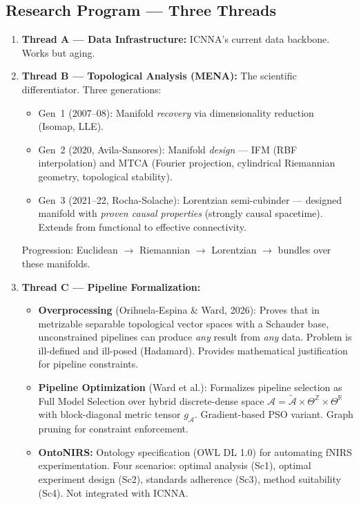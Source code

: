 \documentclass[11pt,a4paper]{article}
\begin{document}
\subsection{Research Program --- Three Threads}
\begin{enumerate}
    \item \textbf{Thread A --- Data Infrastructure:} ICNNA's current data backbone. Works but aging.
    \item \textbf{Thread B --- Topological Analysis (MENA):} The scientific differentiator. Three generations:
    \begin{itemize}
        \item Gen~1 (2007--08): Manifold \emph{recovery} via dimensionality reduction (Isomap, LLE).
        \item Gen~2 (2020, Avila-Sansores): Manifold \emph{design} --- IFM (RBF interpolation) and MTCA (Fourier projection, cylindrical Riemannian geometry, topological stability).
        \item Gen~3 (2021--22, Rocha-Solache): Lorentzian semi-cubinder --- designed manifold with \emph{proven causal properties} (strongly causal spacetime). Extends from functional to effective connectivity.
    \end{itemize}
    Progression: Euclidean $\to$ Riemannian $\to$ Lorentzian $\to$ bundles over these manifolds.
    \item \textbf{Thread C --- Pipeline Formalization:}
    \begin{itemize}
        \item \textbf{Overprocessing} (Orihuela-Espina \& Ward, 2026): Proves that in metrizable separable topological vector spaces with a Schauder base, unconstrained pipelines can produce \emph{any} result from \emph{any} data. Problem is ill-defined and ill-posed (Hadamard). Provides mathematical justification for pipeline constraints.
        \item \textbf{Pipeline Optimization} (Ward et al.): Formalizes pipeline selection as Full Model Selection over hybrid discrete-dense space $\mathcal{A} = \tilde{\mathcal{A}} \times \Theta^{\mathbb{Z}} \times \Theta^{\mathbb{R}}$ with block-diagonal metric tensor $g_{\mathcal{A}}$. Gradient-based PSO variant. Graph pruning for constraint enforcement.
        \item \textbf{OntoNIRS:} Ontology specification (OWL DL 1.0) for automating fNIRS experimentation. Four scenarios: optimal analysis (Sc1), optimal experiment design (Sc2), standards adherence (Sc3), method suitability (Sc4). Not integrated with ICNNA.
    \end{itemize}
\end{enumerate}
\end{document}

